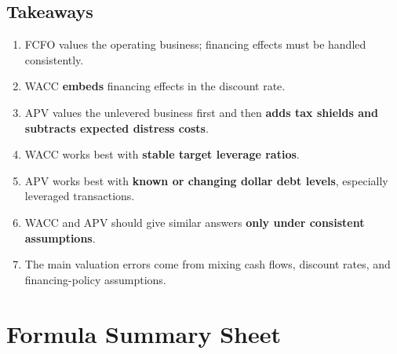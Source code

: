 \subsection{Takeaways}
\begin{enumerate}
  \item FCFO values the operating business; financing effects must be handled consistently.
  \item WACC \textbf{embeds} financing effects in the discount rate.
  \item APV values the unlevered business first and then \textbf{adds tax shields and subtracts expected distress costs}.
  \item WACC works best with \textbf{stable target leverage ratios}.
  \item APV works best with \textbf{known or changing dollar debt levels}, especially leveraged transactions.
  \item WACC and APV should give similar answers \textbf{only under consistent assumptions}.
  \item The main valuation errors come from mixing cash flows, discount rates, and financing-policy assumptions.
\end{enumerate}

\section{Formula Summary Sheet}

